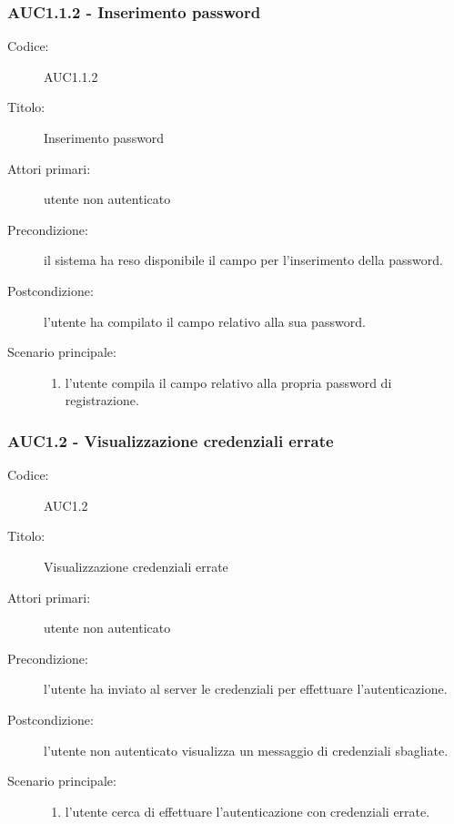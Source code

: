 \documentclass[../../../analisi-dei-requisiti.tex]{subfiles}
\begin{document}
\subsubsection{AUC1.1.2 - Inserimento password}%
\label{subs:AUC1.1.2}
\begin{description}
  \item[Codice:] AUC1.1.2
  \item[Titolo:] Inserimento password
  \item[Attori primari:] utente non autenticato
  \item[Precondizione:] il sistema ha reso disponibile il campo per l'inserimento della password.
  \item[Postcondizione:] l'utente ha compilato il campo relativo alla sua password.
  \item[Scenario principale:]
  \begin{enumerate}
    \item l'utente compila il campo relativo alla propria password di registrazione.
  \end{enumerate}
\end{description}

\subsubsection{AUC1.2 - Visualizzazione credenziali errate}%
\label{subs:AUC1.2}
\begin{description}
  \item[Codice:] AUC1.2
  \item[Titolo:] Visualizzazione credenziali errate
  \item[Attori primari:] utente non autenticato
  \item[Precondizione:] l'utente ha inviato al server le credenziali per effettuare l'autenticazione.
  \item[Postcondizione:] l'utente non autenticato visualizza un messaggio di credenziali sbagliate.
  \item[Scenario principale:]
  \begin{enumerate}
    \item l'utente cerca di effettuare l'autenticazione con credenziali errate.
  \end{enumerate}
\end{description}
\end{document}
